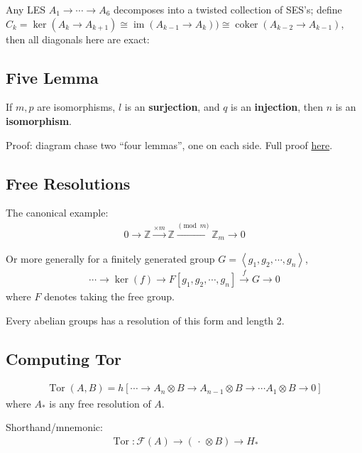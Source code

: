 Any LES \(A_1 \to\cdots \to A_6\) decomposes into a twisted collection
of SES's; define
\(C_k = \ker (A_k \to A_{k+1}) \cong \operatorname{im}(A_{k-1} \to A_k)) \cong \operatorname{coker}(A_{k-2} \to A_{k-1})\),
then all diagonals here are exact:

\hypertarget{five-lemma}{%
\subsection{Five Lemma}\label{five-lemma}}

If \(m, p\) are isomorphisms, \(l\) is an \textbf{surjection}, and \(q\)
is an \textbf{injection}, then \(n\) is an \textbf{isomorphism}.

Proof: diagram chase two ``four lemmas'', one on each side. Full proof
\href{https://en.wikipedia.org/wiki/Five_lemma}{here}.

\hypertarget{free-resolutions}{%
\subsection{Free Resolutions}\label{free-resolutions}}

The canonical example:
\begin{align*}
0 \to {\mathbb{Z}}\xrightarrow{\times m} {\mathbb{Z}}\xrightarrow{\pmod m} {\mathbb{Z}}_m \to 0
\end{align*}

Or more generally for a finitely generated group
\(G = \left\langle{g_1, g_2, \cdots, g_n}\right\rangle\),
\begin{align*}
\cdots \to \ker(f) \to F[g_1, g_2, \cdots, g_n] \xrightarrow{f} G \to 0
\end{align*}
where \(F\) denotes taking the free group.

Every abelian groups has a resolution of this form and length 2.

\hypertarget{computing-tor}{%
\subsection{Computing Tor}\label{computing-tor}}

\begin{align*}
\operatorname{Tor}(A, B) = h[\cdots \to A_n \otimes B \to A_{n-1}\otimes B \to \cdots A_1\otimes B \to 0]
\end{align*}
where \(A_*\) is any free resolution of \(A\).

Shorthand/mnemonic:
\begin{align*}
\operatorname{Tor}: \mathcal{F}(A) \to ({\,\cdot\,}\otimes B) \to H_*
\end{align*}

